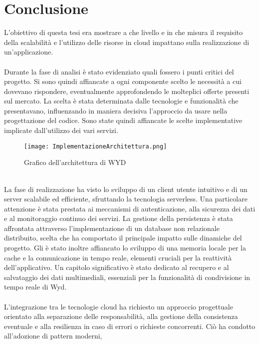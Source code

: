 \clearpage
\chapter*{Conclusione}
L'obiettivo di questa tesi era mostrare a che livello e in che misura
il requisito della scalabilità e l'utilizzo delle risorse in cloud impattano sulla realizzazione di un'applicazione.\\
\\
Durante la fase di analisi è stato evidenziato quali fossero i punti critici del progetto.
Si sono quindi affiancate a ogni componente scelto le necessità a cui dovevano rispondere,
eventualmente approfondendo le molteplici offerte presenti sul mercato.
La scelta è stata determinata dalle tecnologie e funzionalità che presentavano, 
influenzando in maniera decisiva l'approccio da usare
nella progettazione del codice.
Sono state quindi affiancate le scelte implementative implicate dall'utilizzo dei vari servizi.\\
\begin{figure}[htbp]
    \begin{center}
        \texttt{[image: ImplementazioneArchitettura.png]}
        \caption{Grafico dell'architettura di WYD}
    \end{center}
\end{figure}
\\
La fase di realizzazione ha visto lo sviluppo di un client utente intuitivo 
e di un server scalabile ed efficiente, sfruttando la tecnologia serverless.
Una particolare attenzione è stata prestata ai meccanismi di autenticazione, 
alla sicurezza dei dati e al monitoraggio continuo dei servizi.
La gestione della persistenza è stata affrontata 
attraverso l'implementazione di un database non relazionale distribuito,
scelta che ha comportato il principale impatto sulle dinamiche del progetto.
Gli è stato inoltre affiancato lo sviluppo 
di una memoria locale per la cache e la comunicazione in tempo reale, 
elementi cruciali per la reattività dell'applicativo.
Un capitolo significativo è stato dedicato al recupero e al salvataggio dei dati multimediali, 
essenziali per la funzionalità di condivisione in tempo reale di Wyd.\\
\\
L'integrazione tra le tecnologie cloud ha richiesto 
un approccio progettuale orientato alla separazione delle responsabilità, 
alla gestione della consistenza eventuale e alla resilienza in caso di errori o richieste concorrenti. Ciò ha condotto all'adozione di pattern moderni, 
